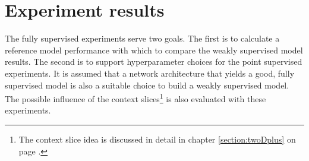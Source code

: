 \section{Experiment results}
\par{
    The fully supervised experiments serve two goals.
    The first is to calculate a reference model performance with which to compare the weakly supervised model results.
    The second is to support hyperparameter choices for the point supervised experiments.
    It is assumed that a network architecture that yields a good, fully supervised model is also a suitable choice to build a weakly supervised model.
    The possible influence of the context slices\footnote{The context slice idea is discussed in detail in chapter \ref{section:twoDplus} on page \pageref{section:twoDplus}.} is also evaluated with these experiments.
}



